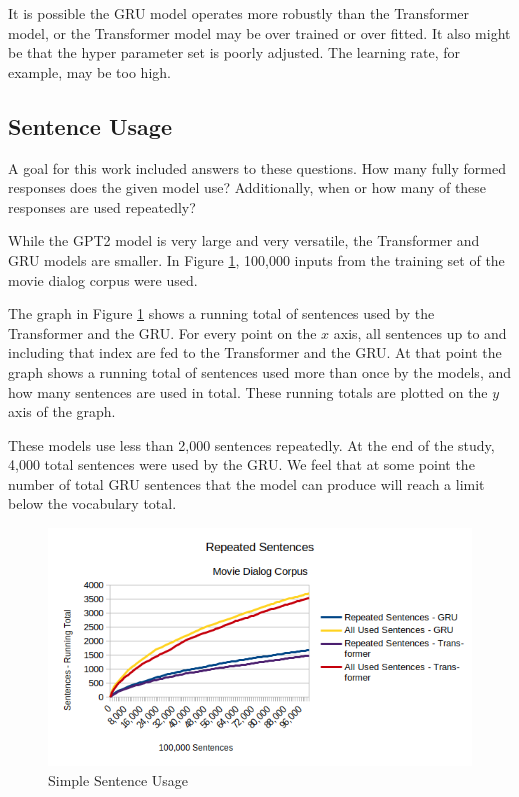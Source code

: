 It is possible the GRU model operates more robustly than the Transformer model, or the Transformer model may be over trained or over fitted. It also might be that the hyper parameter set is poorly adjusted. The learning rate, for example, may be too high.

\subsection{Sentence Usage}
A goal for this work included answers to these questions.
How many fully formed responses does the given model use? Additionally, when or how many of these responses are used repeatedly?

While the GPT2 model is very large and very versatile, the Transformer and GRU models are smaller. In Figure \ref{diagram-words-limit-shown}, 100,000 inputs from the training set of the movie dialog corpus were used. 

The graph in Figure \ref{diagram-words-limit-shown} shows a running total of sentences used by the Transformer and the GRU. For every point on the $x$ axis, all sentences up to and including that index are fed to the Transformer and the GRU. At that point the graph shows a running total of sentences used more than once by the models, and how many sentences are used in total. These running totals are plotted on the $y$ axis of the graph.

These models use less than 2,000 sentences repeatedly. At the end of the study, 4,000 total sentences were used by the GRU. We feel that at some point the number of total GRU sentences that the model can produce will reach a limit below the vocabulary total.

\begin{figure}[H]
	\begin{center}
		\includegraphics[scale=0.75]{diagram-100000-sent}
		
		
	\end{center}
	\caption[Simple Sentence Usage]{Simple Sentence Usage}
	\label{diagram-words-limit-shown}
	
\end{figure}

